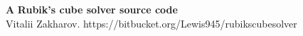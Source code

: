\documentclass[../main]{subfiles}
\begin{document}
\noindent\textbf{\Large A} \hspace{5mm} \textbf{\Large Rubik's cube solver source code} \\
Vitalii Zakharov. https://bitbucket.org/Lewis945/rubikscubesolver
\end{document}
